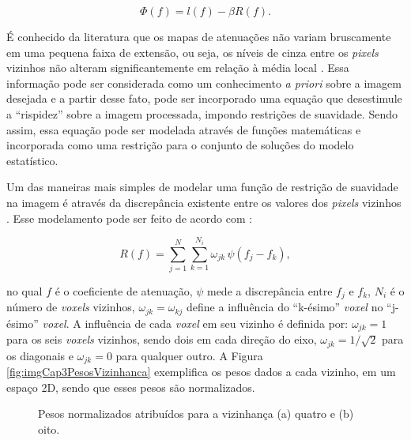 {{\begin{equation}
\Phi(f) = l(f) - \beta R(f).
\label{eq:eqCap3TeoremaBayesLogSimplificadaFinal}
\end{equation}

É conhecido da literatura que os mapas de atenuações não variam bruscamente em uma pequena faixa de extensão, ou seja, os níveis de cinza entre os \textit{pixels} vizinhos não alteram significantemente em relação à média local \cite{Fessler2000handbook,buzug2008computed}. Essa informação pode ser considerada como um conhecimento \textit{a priori} sobre a imagem desejada e a partir desse fato, pode ser incorporado uma equação que desestimule a ``rispidez'' sobre a imagem processada, impondo restrições de suavidade. Sendo assim, essa equação pode ser modelada através de funções matemáticas e incorporada como uma restrição para o conjunto de soluções do modelo estatístico.

Um das maneiras mais simples de modelar uma função de restrição de suavidade na imagem é através da discrepância existente entre os valores dos \textit{pixels} vizinhos \cite[p. 12]{Fessler2000handbook}. Esse modelamento pode ser feito de acordo com :

\begin{equation}
R(f) = \sum_{j=1}^{N}  \sum_{k=1}^{N_{i}} \omega_{jk} \, \psi(f_{j}-f_{k}),
\label{eq:eqCap3DiscrepanciaPixels}
\end{equation}  

\noindent no qual $f$ é o coeficiente de atenuação, $\psi$ mede a discrepância entre $f_{j}$ e $f_{k}$, $N_{i}$ é o número de \textit{voxels} vizinhos, $\omega_{jk} = \omega_{kj}$ define a influência do ``k-ésimo'' \textit{voxel} no ``j-ésimo'' \textit{voxel}. A influência de cada \textit{voxel} em seu vizinho é definida por: $\omega_{jk} = 1$ para os seis \textit{voxels} vizinhos, sendo dois em cada direção do eixo, $\omega_{jk} = 1/\sqrt{2}$ para os diagonais e $\omega_{jk} = 0$ para qualquer outro. A Figura \ref{fig:imgCap3PesosVizinhanca} exemplifica os pesos dados a cada vizinho, em um espaço \acs{2D}, sendo que esses pesos são normalizados.


\begin{figure}[H]
	\centering
	
	\caption{Pesos normalizados atribuídos para a vizinhança (a) quatro e (b) oito.}
	
	

\end{figure}}}

